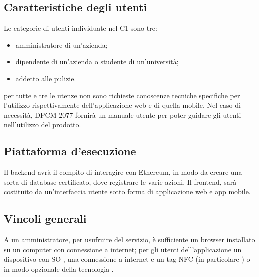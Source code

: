 \subsection{Caratteristiche degli utenti}
Le categorie di utenti individuate nel C1 sono tre:
\begin{itemize}
	\item amministratore di un'azienda;
	\item dipendente di un'azienda o studente di un'università;
    \item addetto alle pulizie.
\end{itemize}
per tutte e tre le utenze non sono richieste conoscenze tecniche specifiche per l'utilizzo rispettivamente dell'applicazione web e di quella mobile. Nel caso di necessità, DPCM 2077 fornirà un manuale utente per poter guidare gli utenti nell'utilizzo del prodotto.
\subsection{Piattaforma d'esecuzione}
Il backend avrà il compito di interagire con Ethereum, in modo da creare una sorta di database certificato, dove registrare le varie azioni. Il frontend, sarà costituito da un'interfaccia utente sotto forma di applicazione web e app mobile. 
\subsection{Vincoli generali}
A un amministratore, per usufruire del servizio, è sufficiente un browser installato su un computer con connessione a internet; per gli utenti dell'applicazione un dispositivo con SO , una connessione a internet e un tag NFC (in particolare ) o in modo opzionale della tecnologia .

